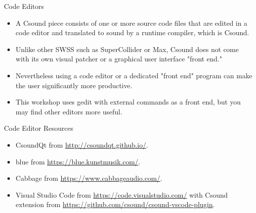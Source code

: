\documentclass{beamer}
\begin{document}
    \begin{frame}{Code Editors}
        \begin{itemize}
            \item A Csound piece consists of one or more source code files that are
            edited in a code editor and translated to sound by a runtime compiler, which is
            Csound.
            \item Unlike other SWSS such as SuperCollider or Max, Csound does not
            come with its own visual patcher or a graphical user interface "front end."
            \item Nevertheless using a code editor or a dedicated "front end"
            program can make the user significantly more productive.
            \item This workshop uses gedit with external commands as a front end, but you 
            may find other editors more useful.
        \end{itemize}
    \end{frame}
    \begin{frame}{Code Editor Resources}
        \begin{itemize}
            \item CsoundQt from \url{http://csoundqt.github.io/}.
            \item blue from \url{https://blue.kunstmusik.com/}.
            \item Cabbage from \url{https://www.cabbageaudio.com/}.
            \item Visual Studio Code from \url{https://code.visualstudio.com/} with
            Csound extension from \url{https://github.com/csound/csound-vscode-plugin}.
        \end{itemize}
    \end{frame}
    
\end{document}
